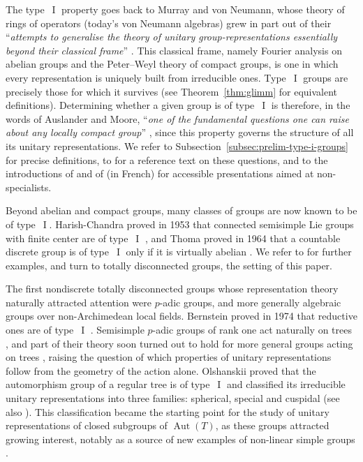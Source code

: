 \documentclass[11pt]{amsart}
\numberwithin{equation}{section}
\DeclareMathOperator{\I}{I}
\DeclareMathOperator{\Aut}{Aut}
\theoremstyle{definition}
\begin{document}
The type~$\I$ property goes back to Murray and von Neumann, whose theory of rings of operators (today's von Neumann algebras) grew in part out of their ``\textit{attempts to generalise the theory of unitary group-representations essentially beyond their classical frame}'' \cite{MvN36}. This classical frame, namely Fourier analysis on abelian groups and the Peter--Weyl theory of compact groups, is one in which every representation is uniquely built from irreducible ones. Type~$\I$ groups are precisely those for which it survives (see Theorem~\ref{thm:glimm} for equivalent definitions). Determining whether a given group is of type~$\I$ is therefore, in the words of Auslander and Moore, ``\textit{one of the fundamental questions one can raise about any locally compact group}'' \cite[p.~1]{AM66}, since this property governs the structure of all its unitary representations. We refer to Subsection~\ref{subsec:prelim-type-i-groups} for precise definitions, to \cite{BH20} for a reference text on these questions, and to the introductions of \cite{Semal23} and of \cite{Mo25} (in French) for accessible presentations aimed at non-specialists.

Beyond abelian and compact groups, many classes of groups are now known to be of type~$\I$. Harish-Chandra proved in 1953 that connected semisimple Lie groups with finite center are of type~$\I$ \cite{HC53}, and Thoma proved in 1964 that a countable discrete group is of type~$\I$ only if it is virtually abelian \cite{Th64}. We refer to \cite{BH20} for further examples, and turn to totally disconnected groups, the setting of this paper. 

The first nondiscrete totally disconnected groups whose representation theory naturally attracted attention were $p$-adic groups, and more generally algebraic groups over non-Archimedean local fields. Bernstein proved in 1974 that reductive ones are of type~$\I$ \cite{Be74}. Semisimple $p$-adic groups of rank one act naturally on trees \cite{BT72}, and part of their theory soon turned out to hold for more general groups acting on trees \cite{Ti70,Ca73}, raising the question of which properties of unitary representations follow from the geometry of the action alone. Olshanskii proved that the automorphism group of a regular tree is of type~$\I$ \cite{Ol75} and classified its irreducible unitary representations into three families: spherical, special and cuspidal \cite{Ol77} (see also \cite[\S10]{Ca73}). This classification became the starting point for the study of unitary representations of closed subgroups of $\Aut(T)$, as these groups attracted growing interest, notably as a source of new examples of non-linear simple groups \cite{Ti70,BM00}.
\end{document}
